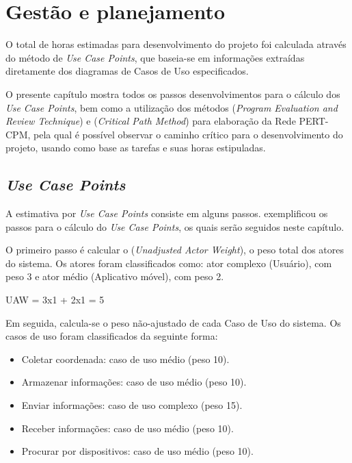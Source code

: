 %
%
\chapter{Gestão e planejamento}\label{cap:gestao}

O total de horas estimadas para desenvolvimento do projeto foi calculada através do método de \textit{Use Case Points}, que baseia-se em informações extraídas diretamente dos diagramas de Casos de Uso especificados.

O presente capítulo mostra todos os passos desenvolvimentos para o cálculo dos \textit{Use Case Points}, bem como a utilização dos métodos  (\textit{Program Evaluation and Review Technique}) e  (\textit{Critical Path Method}) para elaboração da Rede PERT-CPM, pela qual é possível observar o caminho crítico para o desenvolvimento do projeto, usando como base as tarefas e suas horas estipuladas.

\section{\textit{Use Case Points}}

A estimativa por \textit{Use Case Points} consiste em alguns passos.  exemplificou os passos para o cálculo do \textit{Use Case Points}, os quais serão seguidos neste capítulo.

O primeiro passo é calcular o  (\textit{Unadjusted Actor Weight}), o peso total dos atores do sistema. Os atores foram classificados como: ator complexo (Usuário), com peso 3 e ator médio (Aplicativo móvel), com peso 2.

\begin{center}
UAW = 3x1 + 2x1 = 5
\end{center}

Em seguida, calcula-se o peso não-ajustado de cada Caso de Uso do sistema. Os casos de uso foram classificados da seguinte forma:

\begin{itemize}
\item Coletar coordenada: caso de uso médio (peso 10).
\item Armazenar informações: caso de uso médio (peso 10).
\item Enviar informações: caso de uso complexo (peso 15).
\item Receber informações: caso de uso médio (peso 10).
\item Procurar por dispositivos: caso de uso médio (peso 10).
\end{itemize}

